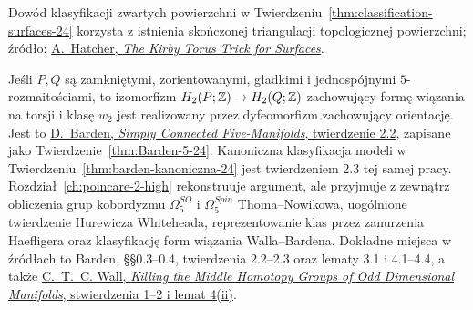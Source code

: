 \begin{description}[leftmargin=2.9cm,style=nextline]
\item[Triangulacja powierzchni.]
  Dowód klasyfikacji zwartych powierzchni
  w Twierdzeniu~\ref{thm:classification-surfaces-24}
  korzysta z istnienia skończonej triangulacji
  topologicznej powierzchni; źródło:
  \href{https://pi.math.cornell.edu/~hatcher/Papers/TorusTrick.pdf}
  {A.\ Hatcher, \emph{The Kirby Torus Trick for Surfaces}}.

\item[Klasyfikacja Bardena w wymiarze pięć.]
  Jeśli $P,Q$ są zamkniętymi, zorientowanymi, gładkimi
  i jednospójnymi $5$-rozmaitościami, to izomorfizm
  $H_2(P;\mathbb{Z})\to H_2(Q;\mathbb{Z})$ zachowujący formę wiązania
  na torsji i klasę $w_2$ jest realizowany przez
  dyfeomorfizm zachowujący orientację. Jest to
  \href{https://www.sas.rochester.edu/mth/sites/doug-ravenel/otherpapers/barden.pdf}
  {D.\ Barden, \emph{Simply Connected
  Five-Manifolds}, twierdzenie 2.2}, zapisane jako
  Twierdzenie~\ref{thm:Barden-5-24}. Kanoniczna
  klasyfikacja modeli w
  Twierdzeniu~\ref{thm:barden-kanoniczna-24}
  jest twierdzeniem 2.3 tej samej pracy.
  Rozdział~\ref{ch:poincare-2-high} rekonstruuje argument,
  ale przyjmuje z zewnątrz obliczenia grup kobordyzmu
  $\Omega^{SO}_5$ i $\Omega^{Spin}_5$ Thoma--Nowikowa,
  uogólnione twierdzenie Hurewicza Whiteheada,
  reprezentowanie klas przez zanurzenia Haefligera oraz
  klasyfikację form wiązania Walla--Bardena. Dokładne
  miejsca w źródłach to Barden, §§0.3--0.4,
  twierdzenia 2.2--2.3 oraz lematy 3.1 i 4.1--4.4, a także
  \href{https://webhomes.maths.ed.ac.uk/~v1ranick/papers/kill.pdf}
  {C.~T.~C. Wall, \emph{Killing the Middle Homotopy Groups
  of Odd Dimensional Manifolds}, stwierdzenia 1--2
  i lemat 4(ii)}.


\end{description}
